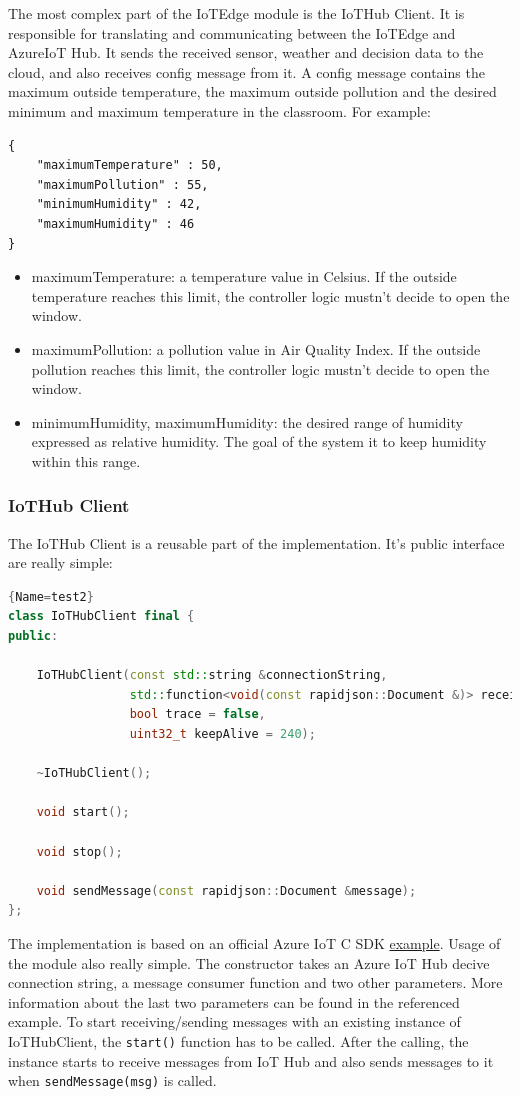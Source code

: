 \documentclass{article}
\begin{document}
The most complex part of the IoTEdge module is the IoTHub Client. It is responsible for translating and communicating between the IoTEdge and AzureIoT Hub. It sends the received sensor, weather and decision data to the cloud, and also receives config message from it. A config message contains the maximum outside temperature, the maximum outside pollution and the desired minimum and maximum temperature in the classroom. For example:
\begin{verbatim}
{
    "maximumTemperature" : 50,
    "maximumPollution" : 55,
    "minimumHumidity" : 42,
    "maximumHumidity" : 46
}
\end{verbatim}
\begin{itemize}
\item maximumTemperature: a temperature value in Celsius. If the outside temperature reaches this limit, the controller logic mustn't decide to open the window.
\item maximumPollution:  a pollution value in Air Quality Index. If the outside pollution reaches this limit, the controller logic mustn't decide to open the window.
\item minimumHumidity, maximumHumidity: the desired range of humidity expressed as relative humidity. The goal of the system it to keep humidity within this range.
\end{itemize}
\subsubsection{IoTHub Client}

The IoTHub Client is a reusable part of the implementation. It's public interface are really simple:

\begin{lstlisting}[language=C++]{Name=test2}
class IoTHubClient final {
public:

    IoTHubClient(const std::string &connectionString,
                 std::function<void(const rapidjson::Document &)> receivedMessageConsumer, 
                 bool trace = false,
                 uint32_t keepAlive = 240);

    ~IoTHubClient();

    void start();

    void stop();

    void sendMessage(const rapidjson::Document &message);
};
\end{lstlisting}

The implementation is based on an official Azure IoT C SDK \href{https://github.com/Azure/azure-iot-sdk-c/blob/master/iothub_client/samples/iothub_client_sample_amqp/iothub_client_sample_amqp.c}{example}. Usage of the module also really simple. The constructor takes an Azure IoT Hub decive connection string, a message consumer function and two other parameters. More information about the last two parameters can be found in the referenced example. To start receiving/sending messages with an existing instance of IoTHubClient, the \verb+start()+ function has to be called. After the calling, the instance starts to receive messages from IoT Hub and also sends messages to it when \verb+sendMessage(msg)+ is called.
\end{document}

